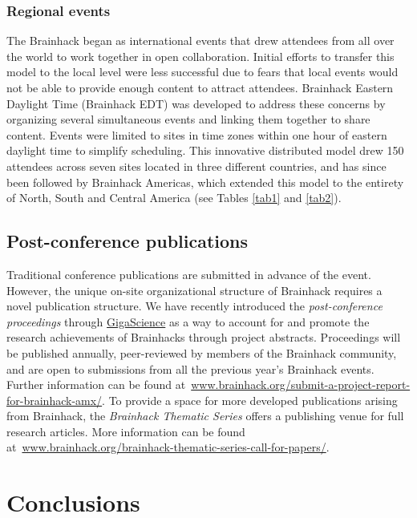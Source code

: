 \documentclass[11pt]{bmc_article_s50}
\begin{document}
\subsubsection{Regional events}

The Brainhack began as international events that drew attendees from all over the world to work together in open collaboration. Initial efforts to transfer this model to the local level were less successful due to fears that local events would not be able to provide enough content to attract attendees. Brainhack Eastern Daylight Time (Brainhack EDT) was developed to address these concerns by organizing several simultaneous events and linking them together to share content. Events were limited to sites in time zones within one hour of eastern daylight time to simplify scheduling. This innovative distributed model drew 150 attendees across seven sites located in three different countries, and has since been followed by Brainhack Americas, which extended this model to the entirety of North, South and Central America (see Tables \ref{tab1} and \ref{tab2}).

\subsection{Post-conference publications}

Traditional conference publications are submitted in advance of the event. However, the unique on-site organizational structure of Brainhack requires a novel publication structure. We have recently introduced the \emph{post-conference proceedings} through \href{http://www.gigasciencejournal.com/}{GigaScience} as a way to account for and promote the research achievements of Brainhacks through project abstracts. Proceedings will be published annually, peer-reviewed by members of the Brainhack community, and are open to submissions from all the previous year's Brainhack events. Further information can be found at~\href{http://brainhack.org/submit-a-project-report-for-brainhack-amx/}{www.brainhack.org/submit-a-project-report-for-brainhack-amx/}. To provide a space for more developed publications arising from Brainhack, the \emph{Brainhack Thematic Series} offers a publishing venue for full research articles. More information can be found at~\href{http://brainhack.org/brainhack-thematic-series-call-for-papers/}{www.brainhack.org/brainhack-thematic-series-call-for-papers/}.

\section{Conclusions}
\end{document}
